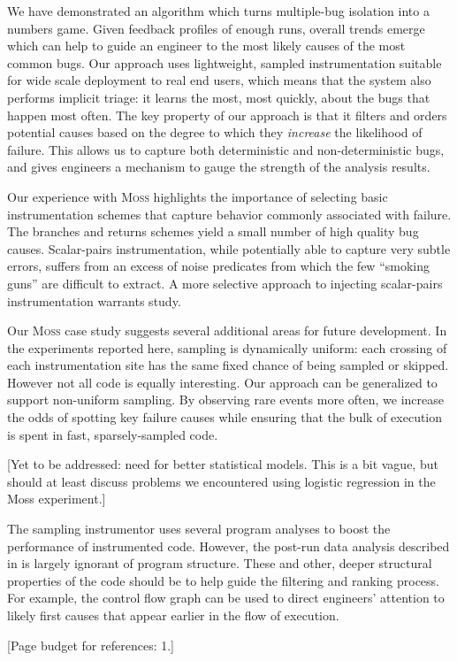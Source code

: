 \documentclass{sig-alternate}
\newcommand{\moss}{\textsc{Moss}\xspace}
\newcommand{\placeholder}[1]{{\color[cmyk]{0,0.61,0.87,0}[#1]}}
\begin{document}
We have demonstrated an algorithm which turns multiple-bug isolation
into a numbers game.  Given feedback profiles of enough runs, overall
trends emerge which can help to guide an engineer to the most likely
causes of the most common bugs.  Our approach uses lightweight,
sampled instrumentation suitable for wide scale deployment to real end
users, which means that the system also performs implicit triage: it
learns the most, most quickly, about the bugs that happen most often.
The key property of our approach is that it filters and orders
potential causes based on the degree to which they \emph{increase} the
likelihood of failure.  This allows us to capture both deterministic
and non-deterministic bugs, and gives engineers a mechanism to gauge
the strength of the analysis results.

Our experience with \moss highlights the importance of selecting basic
instrumentation schemes that capture behavior commonly associated with
failure.  The branches and returns schemes yield a small number of
high quality bug causes.  Scalar-pairs instrumentation, while
potentially able to capture very subtle errors, suffers from an excess
of noise predicates from which the few ``smoking guns'' are difficult
to extract.  A more selective approach to injecting scalar-pairs
instrumentation warrants study.

Our \moss case study suggests several additional areas for future
development.  In the experiments reported here, sampling is
dynamically uniform: each crossing of each instrumentation site has
the same fixed chance of being sampled or skipped.  However not all
code is equally interesting.  Our approach can be generalized to
support non-uniform sampling.  By observing rare events more often, we
increase the odds of spotting key failure causes while ensuring that
the bulk of execution is spent in fast, sparsely-sampled code.

\placeholder{Yet to be addressed: need for better statistical models.
  This is a bit vague, but should at least discuss problems we
  encountered using logistic regression in the Moss experiment.}

The sampling instrumentor uses several program analyses to boost the
performance of instrumented code.  However, the post-run data analysis
described in  is largely ignorant of program
structure.  These and other, deeper structural properties of the code
should be to help guide the filtering and ranking process.  For
example, the control flow graph can be used to direct engineers'
attention to likely first causes that appear earlier in the flow of
execution.


\placeholder{Page budget for references: 1.}
\end{document}
